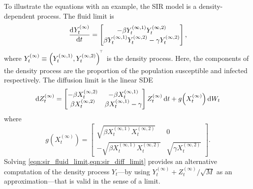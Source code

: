 To illustrate the equations with an example, the SIR model is a density-dependent process.
The fluid limit is
\begin{equation}
	\dod{Y_t^{(\infty)}}{t} = \begin{bmatrix}
		-\beta Y_t^{(\infty,1)} Y_t^{(\infty, 2)} \\
		\beta Y_t^{(\infty,1)} Y_t^{(\infty, 2)} -\gamma Y_t^{(\infty, 2)}
	\end{bmatrix},
	\label{eqn:sir_fluid_limit}
\end{equation}
where \(Y_t^{(\infty)} \equiv \left(Y_t^{(\infty, 1)},Y_t^{(\infty, 2)}\right)^{^{\!\top}}\) is the density process.
Here, the components of the density process are the proportion of the population susceptible and infected respectively.
The diffusion limit is the linear SDE
\begin{equation}
	\dif Z_t^{(\infty)} = \begin{bmatrix}
		-\beta X_t^{(\infty, 2)} & -\beta X_t^{(\infty, 1)}         \\
		\beta X_t^{(\infty, 2)}  & \beta X_t^{(\infty, 1)} - \gamma
	\end{bmatrix} Z_t^{(\infty)}\dif t + g\!\left(X_t^{(\infty)}\right)\dif W_t
	\label{eqn:sir_diff_limit}
\end{equation}
where
\[
	g\!\left(X_t^{(\infty)}\right) = \begin{bmatrix}
		\sqrt{\beta X_t^{(\infty, 1)} X_t^{(\infty, 2)}}  & 0                               \\
		-\sqrt{\beta X_t^{(\infty, 1)} X_t^{(\infty, 2)}} & \sqrt{\gamma X_t^{(\infty, 2)}}
	\end{bmatrix}.
\]
Solving \cref{eqn:sir_fluid_limit,eqn:sir_diff_limit} provides an alternative computation of the density process \(Y_t\)---by using \(Y_t^{(\infty)} + Z_t^{(\infty)} / \sqrt{M}\) as an approximation---that is valid in the sense of a limit.

